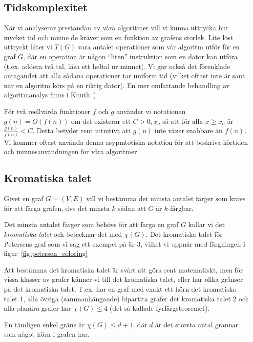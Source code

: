 \documentclass[a4paper]{report}
\begin{document}
\subsection{Tidskomplexitet}

När vi analyserar prestandan av våra algoritmer vill vi kunna uttrycka hur mycket tid och minne de kräver som en funktion av grafens storlek. Lite löst uttryckt
låter vi $T(G)$ vara antalet operationer som vår algoritm utför för en graf $G$, där en operation är någon ``liten'' instruktion som en dator kan utföra (t.ex.
addera två tal, läsa ett heltal ur minnet). Vi gör också det förenklade antagandet att alla sådana operationer tar uniform tid (vilket oftast inte är sant när en algoritm
körs på en riktig dator). En mer omfattande behandling av algoritmanalys finns i Knuth~\cite{Knuth1:1997}).

För två reellvärda funktioner $f$ och $g$ använder vi notationen $g(n) = O(f(n))$ om det existerar ett $C > 0, x_o$ så att för alla $x \ge x_o$ är $\frac{g(n)}{f(n)} < C$. Detta betyder rent intuitivt att $g(n)$
inte växer snabbare än $f(n)$. Vi kommer oftast använda denna asypmtotiska notation för att beskriva körtiden och minnesanvändningen för våra algoritmer.

\subsection{Kromatiska talet}

Givet en graf $G = (V, E)$ vill vi bestämma det minsta antalet färger som krävs för att färga grafen, dvs det minsta $k$ sådan att $G$ är $k$-färgbar.

Det minsta antalet färger som behövs för att färga en graf $G$ kallar vi det \emph{kromatiska talet} och betecknar det med $\chi(G)$. Det kromatiska talet för Petersens graf som vi såg ett exempel på är 3, vilket vi uppnår med färgningen i figur~\ref{fig:petersen_coloring}

Att bestämma det kromatiska talet är svårt att göra rent matematiskt, men för vissa klasser av grafer känner vi till det kromatiska talet, eller har olika
gränser på det kromatiska talet. T.ex. har en graf med exakt ett hörn det kromatiska talet 1, alla övriga (sammanhängande) bipartita grafer det kromatiska talet 2 och alla planära
grafer har $\chi(G)\le 4$ (det så kallade fyrfärgsteoremet).

En tämligen enkel gräns är $\chi(G) \le d + 1$, där $d$ är det största antal grannar som något hörn i grafen har.
\end{document}
